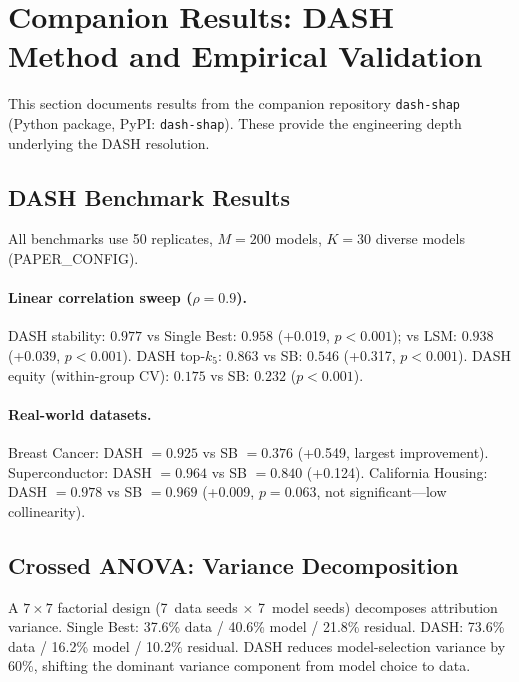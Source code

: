 \documentclass[11pt,a4paper]{article}
\begin{document}

\section{Companion Results: DASH Method and Empirical Validation}
\label{sec:companion-dash}

This section documents results from the companion repository \texttt{dash-shap} (Python package, PyPI: \texttt{dash-shap}).  These provide the engineering depth underlying the DASH resolution.

\subsection{DASH Benchmark Results}

All benchmarks use 50 replicates, $M = 200$ models, $K = 30$ diverse models (PAPER\_CONFIG).

\paragraph{Linear correlation sweep ($\rho = 0.9$).}
DASH stability: $0.977$ vs Single Best: $0.958$ (+0.019, $p < 0.001$); vs LSM: $0.938$ (+0.039, $p < 0.001$).  DASH top-$k_5$: $0.863$ vs SB: $0.546$ (+0.317, $p < 0.001$).  DASH equity (within-group CV): $0.175$ vs SB: $0.232$ ($p < 0.001$).

\paragraph{Real-world datasets.}
Breast Cancer: DASH $= 0.925$ vs SB $= 0.376$ (+0.549, largest improvement).  Superconductor: DASH $= 0.964$ vs SB $= 0.840$ (+0.124).  California Housing: DASH $= 0.978$ vs SB $= 0.969$ (+0.009, $p = 0.063$, not significant---low collinearity).

\subsection{Crossed ANOVA: Variance Decomposition}

A $7 \times 7$ factorial design (7~data seeds $\times$ 7~model seeds) decomposes attribution variance.  Single Best: 37.6\% data / 40.6\% model / 21.8\% residual.  DASH: 73.6\% data / 16.2\% model / 10.2\% residual.  DASH reduces model-selection variance by 60\%, shifting the dominant variance component from model choice to data.
\end{document}
